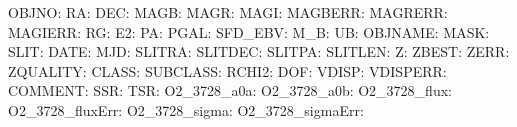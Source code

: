 OBJNO:  \newline 
RA:  \newline 
DEC:  \newline 
MAGB:  \newline 
MAGR:  \newline 
MAGI:  \newline 
MAGBERR:  \newline 
MAGRERR:  \newline 
MAGIERR:  \newline 
RG:  \newline 
E2:  \newline 
PA:  \newline 
PGAL:  \newline 
SFD\_EBV:  \newline 
M\_B:  \newline 
UB:  \newline 
OBJNAME:  \newline 
MASK:  \newline 
SLIT:  \newline 
DATE:  \newline 
MJD:  \newline 
SLITRA:  \newline 
SLITDEC:  \newline 
SLITPA:  \newline 
SLITLEN:  \newline 
Z:  \newline 
ZBEST:  \newline 
ZERR:  \newline 
ZQUALITY:  \newline 
CLASS:  \newline 
SUBCLASS:  \newline 
RCHI2:  \newline 
DOF:  \newline 
VDISP:  \newline 
VDISPERR:  \newline 
COMMENT:  \newline 
SSR:  \newline 
TSR:  \newline 
O2\_3728\_a0a:  \newline 
O2\_3728\_a0b:  \newline 
O2\_3728\_flux:  \newline 
O2\_3728\_fluxErr:  \newline 
O2\_3728\_sigma:  \newline 
O2\_3728\_sigmaErr:  \newline 

